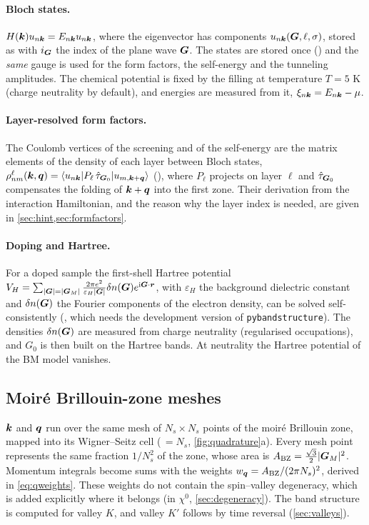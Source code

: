 \paragraph{Bloch states.} $H(\bm k)u_{n\bm k}=E_{n\bm k}u_{n\bm k}$, where the eigenvector has components
$u_{n\bm k}(\bm G,\ell,\sigma)$, stored as  with $i_{\bm G}$ the index of the plane wave $\bm G$. The states are stored once
() and the \emph{same} gauge is used for the form factors, the self-energy
and the tunneling amplitudes. The chemical potential is fixed by the filling at temperature $T=5$ K
(charge neutrality by default), and energies are measured from it, $\xi_{n\bm k}=E_{n\bm k}-\mu$.

\paragraph{Layer-resolved form factors.} The Coulomb vertices of the screening and of the self-energy are the matrix
elements of the density of each layer between Bloch states, $\rho^\ell_{nm}(\bm k,\bm q)=\langle u_{n\bm k}|P_\ell\,\hat\tau_{\bm G_0}|u_{m,\bm k+\bm q}\rangle$
(), where $P_\ell$ projects on layer $\ell$ and $\hat\tau_{\bm G_0}$ compensates the folding of
$\bm k+\bm q$ into the first zone. Their derivation from the interaction Hamiltonian, and the reason why the layer index is
needed, are given in \cref{sec:hint,sec:formfactors}.

\paragraph{Doping and Hartree.} For a doped sample the first-shell Hartree potential
$V_H=\sum_{|\bm G|=|\bm G_M|}\frac{2\pi e^2}{\varepsilon_H|\bm G|}\delta n(\bm G)e^{\mathrm i\bm G\cdot\bm r}$, with $\varepsilon_H$ the background
dielectric constant and $\delta n(\bm G)$ the Fourier components of the electron density, can be solved
self-consistently (, which needs the development version of \texttt{pybandstructure}).
The densities $\delta n(\bm G)$ are measured from charge neutrality (regularised occupations), and
$G_0$ is then built on the Hartree bands. At neutrality the Hartree potential of the BM model vanishes.

\subsection{Moir\'e Brillouin-zone meshes}

$\bm k$ and $\bm q$ run over the same mesh of $N_s\times N_s$ points of the moir\'e Brillouin zone, mapped into its
Wigner--Seitz cell ($\,=N_s$, \cref{fig:quadrature}a). Every mesh point represents the same fraction
$1/N_s^2$ of the zone, whose area is $A_{\rm BZ}=\frac{\sqrt3}{2}|\bm G_M|^2$. Momentum integrals become sums with the
weights $w_{\bm q}=A_{\rm BZ}/(2\pi N_s)^2$, derived in \cref{eq:qweights}. These weights do not contain the spin--valley
degeneracy, which is added explicitly where it belongs (in $\chi^0$, \cref{sec:degeneracy}). The band structure is
computed for valley $K$, and valley $K'$ follows by time reversal (\cref{sec:valleys}).
